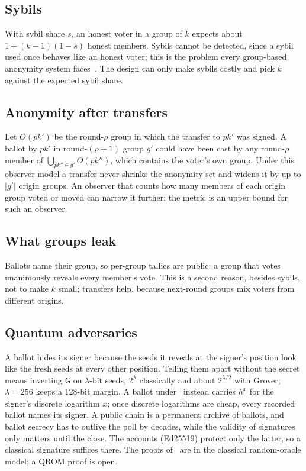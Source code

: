 \documentclass[11pt,a4paper]{article}
\newcommand{\pk}{\mathit{pk}}
\newcommand{\Gf}{\mathsf{G}}
\theoremstyle{definition}
\begin{document}
\subsection{Sybils}
\label{sec:sybils}

With sybil share $s$, an honest voter in a group of $k$ expects about
$1 + (k-1)(1-s)$ honest members. Sybils cannot be detected, since a sybil
used once behaves like an honest voter; this is the problem every
group-based anonymity system faces~\cite{Buddies2013}. The design can only
make sybils costly and pick $k$ against the expected sybil share.

\subsection{Anonymity after transfers}
\label{sec:anon-transfer}

Let $O(\pk')$ be the round-$\rho$ group in which the transfer to $\pk'$
was signed. A ballot by $\pk'$ in round-$(\rho+1)$ group $g'$ could have
been cast by any round-$\rho$ member of $\bigcup_{\pk'' \in g'}
O(\pk'')$, which contains the voter's own group. Under this observer
model a transfer never shrinks the anonymity set and widens it by up to
$|g'|$ origin groups. An observer that counts how many members of each
origin group voted or moved can narrow it further; the metric is an upper
bound for such an observer.

\subsection{What groups leak}

Ballots name their group, so per-group tallies are public: a group that
votes unanimously reveals every member's vote. This is a second reason,
besides sybils, not to make $k$ small; transfers help, because next-round
groups mix voters from different origins.

\subsection{Quantum adversaries}

A ballot hides its signer because the seeds it reveals at the signer's
position look like the fresh seeds at every other position. Telling them
apart without the secret means inverting $\Gf$ on $\lambda$-bit seeds,
$2^\lambda$ classically and about $2^{\lambda/2}$ with Grover;
$\lambda = 256$ keeps a 128-bit margin. A ballot under~\cite{FS07}
instead carries $h^{x}$ for the signer's discrete logarithm $x$; once
discrete logarithms are cheap, every recorded ballot names its signer. A
public chain is a permanent archive of ballots, and ballot secrecy has to
outlive the poll by decades, while the validity of signatures only matters
until the close. The accounts (Ed25519) protect only the latter, so a
classical signature suffices there. The proofs of~\cite{SZ21} are in the
classical random-oracle model; a QROM proof is open.
\end{document}

